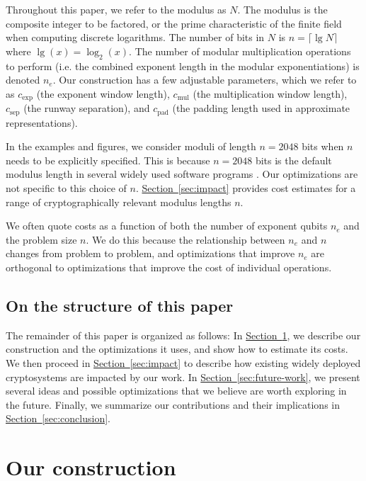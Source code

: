 \documentclass[a4paper, onecolumn, accepted=2021-03-29]{quantumarticle}
\renewcommand{\sec}[1]{\hyperref[sec:#1]{Section~\ref*{sec:#1}}}
\newcommand{\lenexp}{{n_e}}
\newcommand{\gexp}{{c_{\text{exp}}}}
\newcommand{\gmul}{{c_{\text{mul}}}}
\newcommand{\gsep}{{c_{\text{sep}}}}
\newcommand{\gpad}{{c_{\text{pad}}}}
\begin{document}
Throughout this paper, we refer to the modulus as $N$.
The modulus is the composite integer to be factored, or the prime characteristic of the finite field when computing discrete logarithms.
The number of bits in $N$ is $n = \lceil \lg N \rceil$ where $\lg(x) = \log_2(x)$.
The number of modular multiplication operations to perform (i.e. the combined exponent length in the modular exponentiations) is denoted $\lenexp$.
Our construction has a few adjustable parameters, which we refer to as $\gexp$ (the exponent window length), $\gmul$ (the multiplication window length), $\gsep$ (the runway separation), and $\gpad$ (the padding length used in approximate representations).

In the examples and figures, we consider moduli of length $n = 2048$ bits when $n$ needs to be explicitly specified.
This is because $n = 2048$ bits is the default modulus length in several widely used software programs \cite{ssh-keygen-man-page2018, gpg-faq-key-size2018, open-ssl-source2018}.
Our optimizations are not specific to this choice of $n$.
\sec{impact} provides cost estimates for a range of cryptographically relevant modulus lengths $n$.

We often quote costs as a function of both the number of exponent qubits $\lenexp$ and the problem size $n$.
We do this because the relationship between $\lenexp$ and $n$ changes from problem to problem, and optimizations that improve $\lenexp$ are orthogonal to optimizations that improve the cost of individual operations.



\subsection{On the structure of this paper}

The remainder of this paper is organized as follows:
In \sec{construction}, we describe our construction and the optimizations it uses, and show how to estimate its costs.
We then proceed in
\sec{impact} to describe how existing widely deployed cryptosystems are impacted by our work.
In \sec{future-work}, we present several ideas and possible optimizations that we believe are worth exploring in the future.
Finally, we summarize our contributions and their implications in \sec{conclusion}.








\section{Our construction}
\label{sec:construction}
\end{document}
